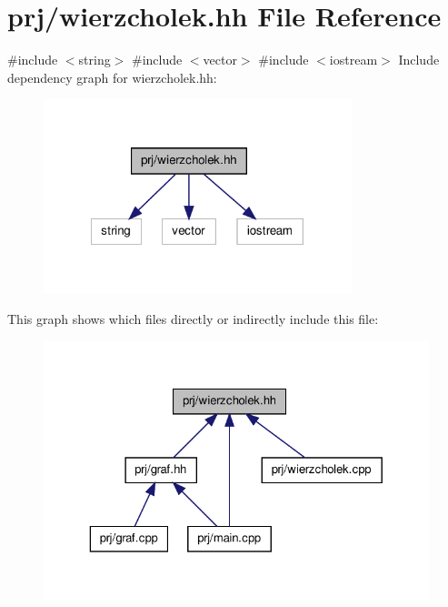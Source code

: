 \hypertarget{wierzcholek_8hh}{\section{prj/wierzcholek.hh \-File \-Reference}
\label{wierzcholek_8hh}
}
{\ttfamily \#include $<$string$>$}\*
{\ttfamily \#include $<$vector$>$}\*
{\ttfamily \#include $<$iostream$>$}\*
\-Include dependency graph for wierzcholek.\-hh\-:\nopagebreak
\begin{figure}[H]
\begin{center}
\leavevmode
\includegraphics[width=254pt]{wierzcholek_8hh__incl}
\end{center}
\end{figure}
\-This graph shows which files directly or indirectly include this file\-:\nopagebreak
\begin{figure}[H]
\begin{center}
\leavevmode
\includegraphics[width=325pt]{wierzcholek_8hh__dep__incl}
\end{center}
\end{figure}
